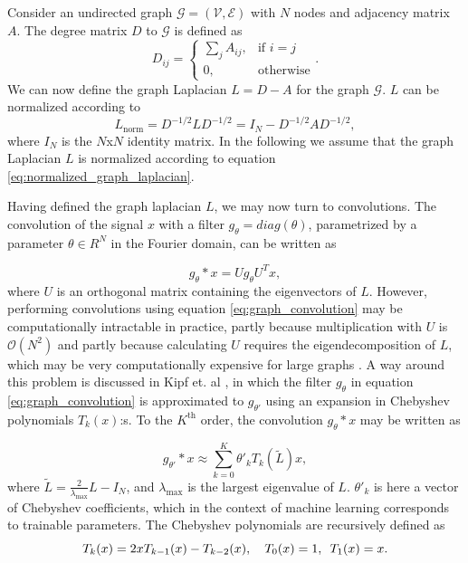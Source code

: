 Consider an undirected graph $\mathcal{G} = (\mathcal{V}, \mathcal{E})$ with $N$ nodes and adjacency matrix $A$. The degree matrix $D$ to $\mathcal{G}$ is defined as 
\begin{equation}
    D_{ij} = \begin{cases} \sum_j A_{ij}, & \mbox{if } i = j \\ \mbox{0,} & \mbox{otherwise} \end{cases}.
    \label{eq:degreematrixdefinition}
\end{equation}
We can now define the graph Laplacian $L= D-A $ for the graph $\mathcal{G}$. $L$ can be normalized according to 
\begin{equation}
    L_\text{norm} = D^{-1/2} L D^{-1/2} =  I_N - D^{-1/2} A D^{-1/2},
    \label{eq:normalized_graph_laplacian}
\end{equation}
where $I_N$ is the $N$x$N$ identity matrix. In the following we assume that the graph Laplacian $L$ is normalized according to equation \eqref{eq:normalized_graph_laplacian}.

Having defined the graph laplacian $L$, we may now turn to convolutions. The convolution of the signal $x$ with a filter $g_\theta = diag(\theta)$, parametrized by a parameter $\theta \in R^N$ in the Fourier domain, can be written as 

\begin{equation}
    g_\theta * x = U g_\theta U^T x,
    \label{eq:graph_convolution}
\end{equation}
where $U$ is an orthogonal matrix containing the eigenvectors of $L$. However, performing convolutions using equation \ref{eq:graph_convolution} may be computationally intractable in practice, partly because multiplication with $U$ is $\mathcal{O}(N^2)$ and partly because calculating $U$ requires the eigendecomposition of $L$, which may be very computationally expensive for large graphs \cite{kipf_semi_supervised}. A way around this problem is discussed in Kipf et. al \cite{kipf_semi_supervised}, in which the filter $g_\theta$ in equation \ref{eq:graph_convolution} is approximated to $g_{\theta'}$ using an expansion in Chebyshev polynomials $T_k(x)$:s. To the $K^{\text{th}}$ order, the convolution $g_\theta * x$ may be written as 

\begin{equation}
    g_{\theta'} * x \approx \sum_{k=0}^K \theta'_k T_k(\tilde{L})x,
    \label{eq:convolution_approximation}
\end{equation}
where $\tilde{L} =  \frac{2}{\lambda_{\text{max}}}L - I_N$, and $\lambda_{\text{max}}$ is the largest eigenvalue of $L$. $\theta'_k$ is here a vector of Chebyshev coefficients, which in the context of machine learning corresponds to trainable parameters. The Chebyshev polynomials are recursively defined as 
\begin{equation}
    T_k(x) = 2xT_{k-1}(x) - T_{k-2}(x), \hspace{10px} T_0(x) = 1, \hspace{5px} T_1(x) = x.
\end{equation}

